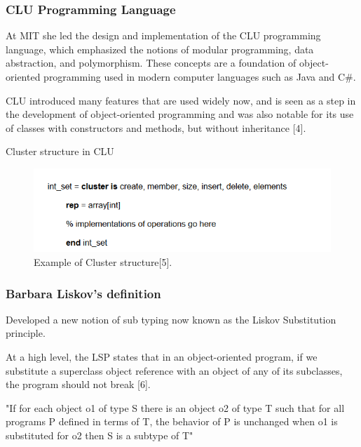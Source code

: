 \documentclass{beamer}
\begin{document}
\begin{frame}
\frametitle{CLU Programming Language}

At MIT she led the design and implementation of the CLU programming language, which emphasized the notions of modular programming, data abstraction, and polymorphism. These concepts are a foundation of object-oriented programming used in modern computer languages such as Java and C\#.

\vspace{5mm}

CLU introduced many features that are used widely now, and is seen as a step in the development of object-oriented programming and was also notable for its use of classes with constructors and methods, but without inheritance [4].

\end{frame}
\begin{frame}{Cluster structure in CLU}
\begin{figure}[h]
\centering
\includegraphics[scale=0.8]{Cluster structure.PNG}
\caption{Example of Cluster structure[5].}

\label{fig: pic1}
\end{figure}   
\end{frame}


\begin{frame}
\frametitle{Barbara Liskov's definition}

Developed a new notion of sub typing now known as the Liskov Substitution principle.

\vspace{5mm} %

At a high level, the LSP states that in an object-oriented program, if we substitute a superclass object reference with an object of any of its subclasses, the program should not break [6].\\

\vspace{5 mm}

"If for each object o1 of type S there is an object o2 of type T such that for all programs P defined in terms of T, the behavior of P is unchanged when o1 is substituted for o2 then S is a subtype of T"


\end{frame}
\end{document}
